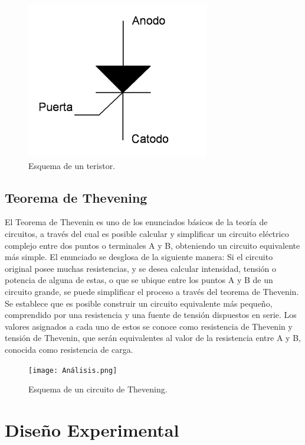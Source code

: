 \documentclass[osajnl,twocolumn,showpacs,superscriptaddress,10pt]{revtex4-1}
\begin{document}
\begin{figure}[H]
\centering
\includegraphics[scale=0.35]{Tiristor.png}
\caption{Esquema de un teristor.}
\end{figure}

\subsection{Teorema de Thevening}

El Teorema de Thevenin es uno de los enunciados básicos de la teoría de circuitos, a través del cual es posible
calcular y simplificar un circuito eléctrico complejo entre dos puntos o terminales A y B, obteniendo un circuito equivalente más simple. El enunciado se desglosa de la siguiente manera: Si el circuito original posee muchas resistencias, y se desea calcular intensidad, tensión o potencia de alguna de estas, o que se ubique entre los puntos A y B de un circuito grande, se puede simplificar el proceso a través del teorema de Thevenin. Se establece que es posible construir un circuito equivalente más pequeño, comprendido por una resistencia y una fuente de tensión dispuestos en serie. Los valores asignados a cada uno de estos se conoce como resistencia de Thevenin y tensión de Thevenin, que serán equivalentes al valor de la resistencia entre A y B, conocida como resistencia de carga.

\begin{figure}[H]
\centering
\texttt{[image: Análisis.png]}
\caption{Esquema de un circuito de Thevening.}
\end{figure}



\section{Diseño Experimental}
\end{document}
